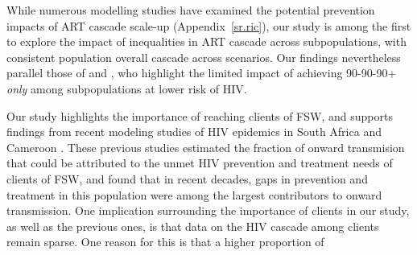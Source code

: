 While numerous modelling studies have examined
the potential prevention impacts of ART cascade scale-up
\cite{Knight2022sr} (Appendix~\ref{sr.ric}),
our study is among the first to explore the impact of
inequalities in ART cascade across subpopulations,
with consistent population overall cascade across scenarios.
Our findings nevertheless parallel those of %
\citet{Maheu-Giroux2017art} and \citet{Marukutira2020},
who highlight the limited impact of achieving 90-90-90+
\emph{only} among subpopulations at lower risk of HIV.
\par
Our study highlights the importance of reaching clients of FSW, and supports  %
findings from recent modeling studies of HIV epidemics in South Africa and Cameroon
 \cite{Stone2021,Silhol2024}. These previous studies estimated the fraction of onward transmision 
that could be attributed to the unmet HIV prevention and treatment needs of clients of FSW, and found that 
in recent decades, gaps in prevention and treatment in this population were among the largest contributors to onward transmission.
One implication surrounding the importance of clients in our study, as well as the previous ones,
is that data on the HIV cascade among clients remain sparse. One reason for this is that a higher proportion of
